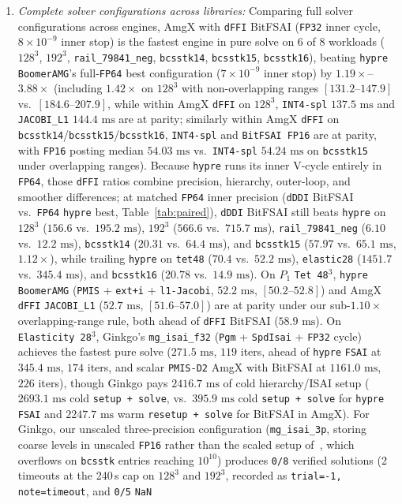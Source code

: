 \documentclass[10pt]{article}
\begin{document}
\begin{enumerate}
  \item \emph{Complete solver configurations across libraries:} Comparing full solver configurations across engines, AmgX with \texttt{dFFI} BitFSAI (\texttt{FP32} inner cycle, $8\times 10^{-9}$ inner stop) is the fastest engine in pure solve on 6 of 8 workloads ($128^3$, $192^3$, \texttt{rail\_79841\_neg}, \texttt{bcsstk14}, \texttt{bcsstk15}, \texttt{bcsstk16}), beating \texttt{hypre} \texttt{BoomerAMG}'s full-\texttt{FP64} best configuration ($7\times 10^{-9}$ inner stop) by $1.19\times$--$3.88\times$ (including $1.42\times$ on $128^3$ with non-overlapping ranges $[131.2\text{--}147.9]$ vs.\ $[184.6\text{--}207.9]$, while within AmgX \texttt{dFFI} on $128^3$, \texttt{INT4-spl} $137.5\text{ ms}$ and \texttt{JACOBI\_L1} $144.4\text{ ms}$ are at parity; similarly within AmgX \texttt{dFFI} on \texttt{bcsstk14}/\texttt{bcsstk15}/\texttt{bcsstk16}, \texttt{INT4-spl} and \texttt{BitFSAI FP16} are at parity, with \texttt{FP16} posting median $54.03\text{ ms}$ vs.\ \texttt{INT4-spl} $54.24\text{ ms}$ on \texttt{bcsstk15} under overlapping ranges). Because \texttt{hypre} runs its inner V-cycle entirely in \texttt{FP64}, those \texttt{dFFI} ratios combine precision, hierarchy, outer-loop, and smoother differences; at matched \texttt{FP64} inner precision (\texttt{dDDI} BitFSAI vs.\ \texttt{FP64} \texttt{hypre} best, Table~\ref{tab:paired}), \texttt{dDDI} BitFSAI still beats \texttt{hypre} on $128^3$ ($156.6$ vs.\ $195.2\text{ ms}$), $192^3$ ($566.6$ vs.\ $715.7\text{ ms}$), \texttt{rail\_79841\_neg} ($6.10$ vs.\ $12.2\text{ ms}$), \texttt{bcsstk14} ($20.31$ vs.\ $64.4\text{ ms}$), and \texttt{bcsstk15} ($57.97$ vs.\ $65.1\text{ ms}$, $1.12\times$), while trailing \texttt{hypre} on \texttt{tet48} ($70.4$ vs.\ $52.2\text{ ms}$), \texttt{elastic28} ($1451.7$ vs.\ $345.4\text{ ms}$), and \texttt{bcsstk16} ($20.78$ vs.\ $14.9\text{ ms}$). On $P_1$ \texttt{Tet 48$^3$}, \texttt{hypre} \texttt{BoomerAMG} (\texttt{PMIS} + \texttt{ext+i} + \texttt{l1-Jacobi}, $52.2\text{ ms}$, $[50.2\text{--}52.8]$) and AmgX \texttt{dFFI} \texttt{JACOBI\_L1} ($52.7\text{ ms}$, $[51.6\text{--}57.0]$) are at parity under our sub-$1.10\times$ overlapping-range rule, both ahead of \texttt{dFFI} BitFSAI ($58.9\text{ ms}$). On \texttt{Elasticity 28$^3$}, Ginkgo's \texttt{mg\_isai\_f32} (\texttt{Pgm} + \texttt{SpdIsai} + \texttt{FP32} cycle) achieves the fastest pure solve ($271.5\text{ ms}$, $119$ iters, ahead of \texttt{hypre} \texttt{FSAI} at $345.4\text{ ms}$, $174$ iters, and scalar \texttt{PMIS-D2} AmgX with BitFSAI at $1161.0\text{ ms}$, $226$ iters), though Ginkgo pays $2416.7\text{ ms}$ of cold hierarchy/ISAI setup ($2693.1\text{ ms}$ cold \texttt{setup + solve}, vs.\ $395.9\text{ ms}$ cold \texttt{setup + solve} for \texttt{hypre} \texttt{FSAI} and $2247.7\text{ ms}$ warm \texttt{resetup + solve} for BitFSAI in AmgX). For Ginkgo, our unscaled three-precision configuration (\texttt{mg\_isai\_3p}, storing coarse levels in unscaled \texttt{FP16} rather than the scaled setup of~\cite{tsai2023three}, which overflows on \texttt{bcsstk} entries reaching $10^{10}$) produces \texttt{0/8} verified solutions (2 timeouts at the 240\,s cap on $128^3$ and $192^3$, recorded as \texttt{trial=-1, note=timeout}, and \texttt{0/5} \texttt{NaN} 
\end{enumerate}
\end{document}
